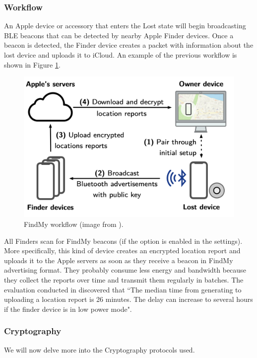 \documentclass[english]{article}
\begin{document}
\subsubsection{Workflow}
An Apple device or accessory that enters the Lost state will begin broadcasting BLE beacons that can be detected by nearby Apple Finder devices. Once a beacon is detected, the Finder device creates a packet with information about the lost device and uploads it to iCloud. An example of the previous workflow is shown in Figure \ref{process}.

\begin{figure}[]
	\centering
	\includegraphics[width=.5\textwidth]{images/process.png}
	\caption{FindMy workflow (image from \cite{whocanfind}).}
	\label{process}
\end{figure}
All Finders scan for FindMy beacons (if the option is enabled in the settings). More specifically, this kind of device creates an encrypted location report and uploads it to the Apple servers as soon as they receive a beacon in FindMy advertising format. They probably consume less energy and bandwidth because they collect the reports over time and transmit them regularly in batches. The evaluation conducted in \cite{whocanfind} discovered that ``The median time from generating to uploading a location report is 26 minutes. The delay can increase to several hours if the finder device is in low power mode".

\subsubsection{Cryptography} \label{sec:crypto}
We will now delve more into the Cryptography protocols used. 
\end{document}
